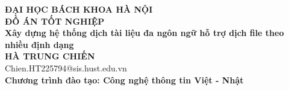 \documentclass[DoAn.tex]{subfiles}
\begin{document}
\begin{titlepage}
\thispagestyle{empty}
\begin{center}

{\textbf{\large{ĐẠI HỌC BÁCH KHOA HÀ NỘI}}}\\[4cm]

{\textbf{\huge{ĐỒ ÁN TỐT NGHIỆP}}}\\[1cm]
{\textbf{\Large{Xây dựng hệ thống dịch tài liệu đa ngôn ngữ hỗ trợ dịch file theo nhiều định dạng}}}\\[1cm]

{\textbf{\large{HÀ TRUNG CHIẾN}}}\\
{\large{Chien.HT225794@sis.hust.edu.vn}}\\[0.5cm]

{\textbf{\large{Chương trình đào tạo: Công nghệ thông tin Việt - Nhật}}}\\

\vspace{2cm}
\begin{table}[H]
\centering
{}
\end{table}

\end{center}

\end{titlepage}
\end{document}
